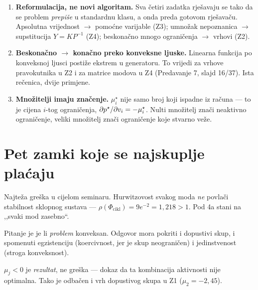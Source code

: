 \begin{korak}
\begin{enumerate}[leftmargin=*]
  \item \textbf{Reformulacija, ne novi algoritam.} Sva četiri zadatka rješavaju se
        tako da se problem \emph{prepiše} u standardnu klasu, a onda preda
        gotovom rješavaču. Apsolutna vrijednost $\to$ pomoćne varijable
        (Z3); umnožak nepoznanica $\to$ supstitucija $Y = KP^{-1}$ (Z4);
        beskonačno mnogo ograničenja $\to$ vrhovi (Z2).
  \item \textbf{Beskonačno $\to$ konačno preko konveksne ljuske.} Linearna
        funkcija po konveksnoj ljusci postiže ekstrem u generatoru. To vrijedi za
        vrhove pravokutnika u Z2 i za matrice modova u Z4 (Predavanje 7, slajd
        16/37). Ista rečenica, dvije primjene.
  \item \textbf{Množitelji imaju značenje.} $\mu_i^{\star}$ nije samo broj koji
        ispadne iz računa --- to je cijena $i$-tog ograničenja,
        $\partial p^{\star}/\partial v_i = -\mu_i^{\star}$. Nulti množitelj znači
        neaktivno ograničenje, veliki množitelj znači ograničenje koje stvarno
        veže.
\end{enumerate}
\end{korak}

\section{Pet zamki koje se najskuplje plaćaju}
\label{sec:pod-zamke}

\begin{zamka}
Najteža greška u cijelom seminaru. Hurwitzovost svakog moda \emph{ne} povlači
stabilnost sklopnog sustava --- $\rho(\Phi_{\mathrm{cikl}}) = 9e^{-2} = 1{,}218 > 1$.
Pod 4a stani na ,,svaki mod zasebno``.
\end{zamka}

\begin{zamka}
Pitanje je je li \emph{problem} konveksan. Odgovor mora pokriti i dopustivi skup,
i spomenuti egzistenciju (koercivnost, jer je skup neograničen) i jedinstvenost
(stroga konveksnost).
\end{zamka}

\begin{zamka}
$\mu_j < 0$ je \emph{rezultat}, ne greška --- dokaz da ta kombinacija aktivnosti
nije optimalna. Tako je odbačen i vrh dopustivog skupa u Z1 ($\mu_2 = -2{,}45$).
\end{zamka}

